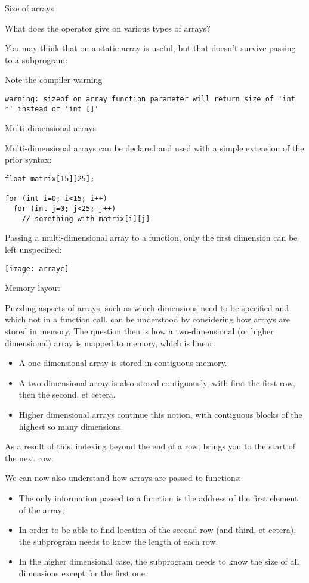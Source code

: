  {Size of arrays}

What does the  operator give on various types of arrays?


You may think that  on a static array is useful,
but that doesn't survive passing to a subprogram:


Note the compiler warning
\begin{verbatim}
warning: sizeof on array function parameter will return size of 'int *' instead of 'int []'
\end{verbatim}

 {Multi-dimensional arrays}

Multi-dimensional arrays can be declared and used with a simple extension of
the prior syntax:
\begin{lstlisting}
float matrix[15][25];

for (int i=0; i<15; i++)
  for (int j=0; j<25; j++)
    // something with matrix[i][j]
\end{lstlisting}

Passing a multi-dimensional array to a function, only the first
dimension can be left unspecified:
%

\texttt{[image: arrayc]}

 {Memory layout}

Puzzling aspects of arrays, such as which dimensions need to be
specified and which not in a function call, can be understood by
considering how arrays are stored in memory.
The question then is how a two-dimensional (or higher dimensional)
array is mapped to memory, which is linear.
\begin{itemize}
\item A one-dimensional array is stored in contiguous memory.
\item A two-dimensional array is also stored contiguously, with first
  the first row, then the second, et cetera.
\item Higher dimensional arrays continue this notion, with contiguous
  blocks of the highest so many dimensions.
\end{itemize}

As a result of this, indexing beyond the end of a row, brings you to the
start of the next row:
%

We can now also understand how arrays are passed to functions:
\begin{itemize}
\item The only information passed to a function is the address of the
  first element of the array;
\item In order to be able to find location of the second row (and
  third, et cetera), the subprogram needs to know the length of each
  row.
\item In the higher dimensional case, the subprogram needs to know the
  size of all dimensions except for the first one.
\end{itemize}

